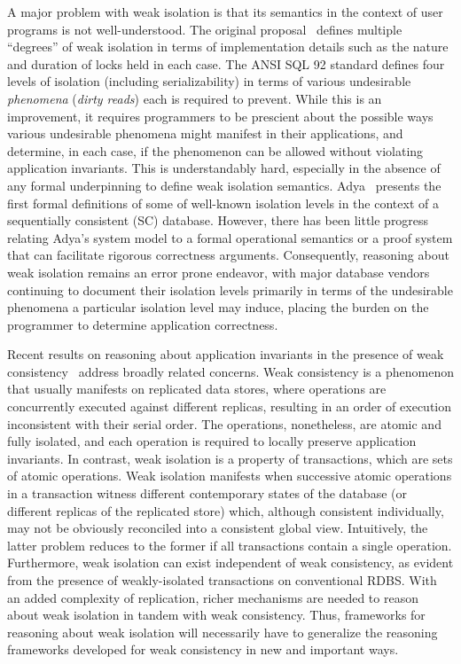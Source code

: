 A major problem with weak isolation is that its semantics in the
context of user programs is not well-understood. The original
proposal~\cite{gray1976} defines multiple ``degrees'' of weak
isolation in terms of implementation details such as the nature and
duration of locks held in each case. The ANSI SQL 92 standard defines
four levels of isolation (including serializability) in terms of
various undesirable \emph{phenomena} (\eg \emph{dirty reads}) each is
required to prevent. While this is an improvement, it requires
programmers to be prescient about the possible ways various
undesirable phenomena might manifest in their applications, and
determine, in each case, if the phenomenon can be allowed without
violating application invariants. This is understandably hard,
especially in the absence of any formal underpinning to define weak
isolation semantics.  Adya~\cite{adyaphd} presents the first formal
definitions of some of well-known isolation levels in the context of a
sequentially consistent (SC) database.  However, there has been little
progress relating Adya's system model to a formal operational
semantics or a proof system that can facilitate rigorous correctness
arguments. Consequently, reasoning about weak isolation remains an
error prone endeavor, with major database vendors~\cite{postgresiso,
  mysqliso, oracleiso} continuing to document their isolation levels
primarily in terms of the undesirable phenomena a particular isolation
level may induce, placing the burden on the programmer to determine
application correctness.

Recent results on reasoning about application invariants in the
presence of weak consistency~\cite{burckhardt14, redblueosdi,
redblueatc, ecinec, gotsmanpopl16} address broadly related concerns.
Weak consistency is a phenomenon that usually manifests on replicated
data stores, where operations are concurrently executed against
different replicas, resulting in an order of execution inconsistent
with their serial order. The operations, nonetheless, are atomic and
fully isolated, and each operation is required to locally preserve
application invariants. In contrast, weak isolation is a property of
transactions, which are sets of atomic operations. Weak isolation
manifests when successive atomic operations in a transaction witness
different contemporary states of the database (or different replicas
of the replicated store) which, although consistent individually, may
not be obviously reconciled into a consistent global view.
Intuitively, the latter problem reduces to the former if all
transactions contain a single operation. Furthermore, weak isolation
can exist independent of weak consistency, as evident from the
presence of weakly-isolated transactions on conventional RDBS. With an
added complexity of replication, richer mechanisms are needed to
reason about weak isolation in tandem with weak consistency. Thus,
frameworks for reasoning about weak isolation will necessarily have to
generalize the reasoning frameworks developed for weak consistency in
new and important ways.

